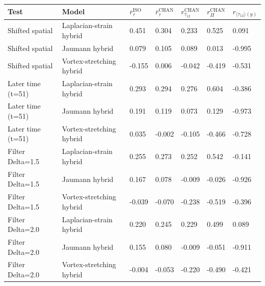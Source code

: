 \begin{tabular}{lllllll}
\toprule
Test & Model & $\overline{r}_{\tau}^{\mathrm{ISO}}$ & $\overline{r}_{\tau}^{\mathrm{CHAN}}$ & $r_{\tau_{12}}^{\mathrm{CHAN}}$ & $r_{\Pi}^{\mathrm{CHAN}}$ & $r_{\langle \tau_{12} \rangle (y)}$ \\
\midrule
Shifted spatial & Laplacian-strain hybrid & 0.451 & 0.304 & 0.233 & 0.525 & 0.091 \\
Shifted spatial & Jaumann hybrid & 0.079 & 0.105 & 0.089 & 0.013 & -0.995 \\
Shifted spatial & Vortex-stretching hybrid & -0.155 & 0.006 & -0.042 & -0.419 & -0.531 \\
Later time (t=51) & Laplacian-strain hybrid & 0.293 & 0.294 & 0.276 & 0.604 & -0.386 \\
Later time (t=51) & Jaumann hybrid & 0.191 & 0.119 & 0.073 & 0.129 & -0.973 \\
Later time (t=51) & Vortex-stretching hybrid & 0.035 & -0.002 & -0.105 & -0.466 & -0.728 \\
Filter Delta=1.5 & Laplacian-strain hybrid & 0.255 & 0.273 & 0.252 & 0.542 & -0.141 \\
Filter Delta=1.5 & Jaumann hybrid & 0.167 & 0.078 & -0.009 & -0.026 & -0.926 \\
Filter Delta=1.5 & Vortex-stretching hybrid & -0.039 & -0.070 & -0.238 & -0.519 & -0.396 \\
Filter Delta=2.0 & Laplacian-strain hybrid & 0.220 & 0.245 & 0.229 & 0.499 & 0.089 \\
Filter Delta=2.0 & Jaumann hybrid & 0.155 & 0.080 & -0.009 & -0.051 & -0.911 \\
Filter Delta=2.0 & Vortex-stretching hybrid & -0.004 & -0.053 & -0.220 & -0.490 & -0.421 \\
\bottomrule
\end{tabular}

